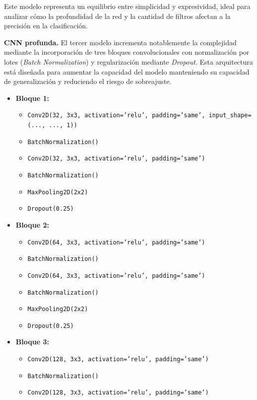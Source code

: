 \documentclass[11pt,spanish,listoffigures,listoftables]{tfgetsinf}
\begin{document}
Este modelo representa un equilibrio entre simplicidad y expresividad, ideal para analizar cómo la profundidad de la red y 
la cantidad de filtros afectan a la precisión en la clasificación.

\textbf{CNN profunda.}  
El tercer modelo incrementa notablemente la complejidad mediante la incorporación de tres bloques convolucionales con 
normalización por lotes (\textit{Batch Normalization}) y regularización mediante \textit{Dropout}. Esta arquitectura 
está diseñada para aumentar la capacidad del modelo manteniendo su capacidad de generalización y reduciendo el riesgo 
de sobreajuste.

\begin{itemize}
    \item \textbf{Bloque 1:}
    \begin{itemize}
        \item \texttt{Conv2D(32, 3x3, activation='relu', padding='same', input\_shape=(..., ..., 1))}
        \item \texttt{BatchNormalization()}
        \item \texttt{Conv2D(32, 3x3, activation='relu', padding='same')}
        \item \texttt{BatchNormalization()}
        \item \texttt{MaxPooling2D(2x2)}
        \item \texttt{Dropout(0.25)}
    \end{itemize}
    \item \textbf{Bloque 2:}
    \begin{itemize}
        \item \texttt{Conv2D(64, 3x3, activation='relu', padding='same')}
        \item \texttt{BatchNormalization()}
        \item \texttt{Conv2D(64, 3x3, activation='relu', padding='same')}
        \item \texttt{BatchNormalization()}
        \item \texttt{MaxPooling2D(2x2)}
        \item \texttt{Dropout(0.25)}
    \end{itemize}
    \item \textbf{Bloque 3:}
    \begin{itemize}
        \item \texttt{Conv2D(128, 3x3, activation='relu', padding='same')}
        \item \texttt{BatchNormalization()}
        \item \texttt{Conv2D(128, 3x3, activation='relu', padding='same')}

\end{itemize}
\end{itemize}
\end{document}
